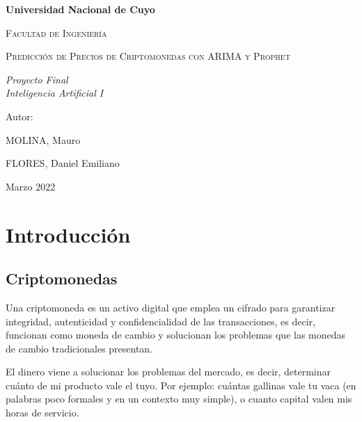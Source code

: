 \documentclass[a4paper,10pt]{article}
\begin{document}
\begin{titlepage}
\centering
{\bfseries\LARGE Universidad Nacional de Cuyo \par}
\vspace{1cm}
{\scshape\Large Facultad de Ingeniería \par}
\vspace{3cm}
{\scshape\Huge Predicción de Precios de Criptomonedas con ARIMA y Prophet \par}
\vspace{3cm}
{\itshape\Large Proyecto Final\\Inteligencia Artificial I \par}
\vfill
{\Large Autor: \par}
{\Large MOLINA, Mauro \par}
{\Large FLORES, Daniel Emiliano \par}
\vfill
{\Large Marzo 2022 \par}
\end{titlepage}

\newpage

\begin{abstract}

\end{abstract}

\newpage

\tableofcontents

\newpage

\section{Introducción}

\subsection{Criptomonedas}

 Una criptomoneda es un activo digital que emplea un cifrado para garantizar integridad, autenticidad y confidencialidad de las transacciones, es decir, funcionan como moneda de cambio y solucionan los problemas que las monedas de cambio tradicionales presentan.

 El dinero viene a solucionar los problemas del mercado, es decir, determinar cuánto de mi producto vale el tuyo. Por ejemplo: cuántas gallinas vale tu vaca (en palabras poco formales y en un contexto muy simple), o cuanto capital valen mis horas de servicio.
\end{document}
